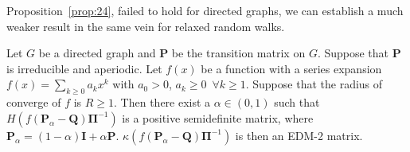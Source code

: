Proposition~\ref{prop:24}, failed to hold for directed graphs, we
can establish a much weaker result in the same vein for relaxed
random walks.
\begin{proposition}
  \label{prop:26}
  Let $G$ be a directed graph and $\mathbf{P}$ be the transition
  matrix on $G$. Suppose that $\mathbf{P}$ is irreducible and
  aperiodic. Let $f(x)$ be a function with a series expansion $f(x) =
  \sum_{k \geq 0}{a_k x^k}$ with $a_0 > 0$, $a_k \geq 0\,\,\, \forall
  k \geq 1$. Suppose that the radius of converge of $f$ is $R \geq
  1$. Then there exist a $\alpha \in (0,1)$ such that
  $H(f(\mathbf{P}_\alpha - \mathbf{Q}) \bm{\Pi}^{-1})$ is a positive
  semidefinite matrix, where $\mathbf{P}_\alpha = (1 -
  \alpha)\mathbf{I} + \alpha \mathbf{P}$. $\kappa( f(\mathbf{P}_\alpha
  - \mathbf{Q})\bm{\Pi}^{-1})$ is then an EDM-2
  matrix.  
\end{proposition}
%
